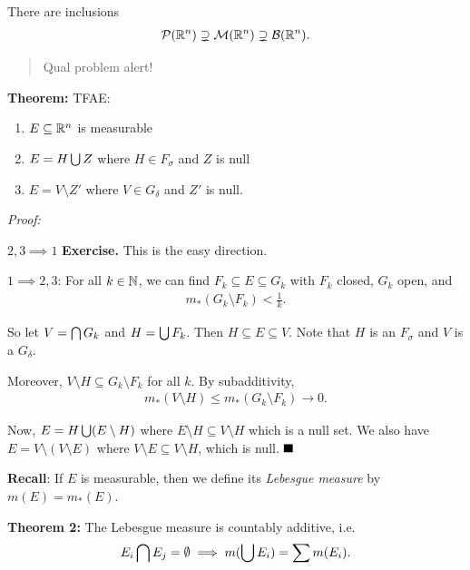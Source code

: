 There are inclusions
\begin{align*}
\mathcal P({\mathbb{R}}^n) \supsetneq \mathcal M({\mathbb{R}}^n) \supsetneq \mathcal B({\mathbb{R}}^n).
\end{align*}

\begin{quote}
Qual problem alert!
\end{quote}

\textbf{Theorem:} TFAE:

\begin{enumerate}
\def\labelenumi{\arabic{enumi}.}
\tightlist
\item
  \(E \subseteq {\mathbb{R}}^n\) is measurable
\item
  \(E = H \bigcup Z\) where \(H \in F_\sigma\) and \(Z\) is null
\item
  \(E = V\setminus Z'\) where \(V\in G_\delta\) and \(Z'\) is null.
\end{enumerate}

\emph{Proof:}

\(2,3 \implies 1\) \textbf{Exercise.} This is the easy direction.

\(1 \implies 2,3\): For all \(k \in {\mathbb{N}}\), we can find
\(F_ k\subseteq E \subseteq G_k\) with \(F_k\) closed, \(G_k\) open, and
\begin{align*}
m_*(G_k\setminus F_k) < \frac 1 k
.\end{align*}

So let \(V = \bigcap G_k\) and \(H = \bigcup F_k\). Then
\(H \subseteq E \subseteq V\). Note that \(H\) is an \(F_\sigma\) and
\(V\) is a \(G_\delta\).

Moreover, \(V\setminus H \subseteq G_k \setminus F_k\) for all \(k\). By
subadditivity,
\begin{align*}
m_*(V\setminus H) \leq m_*(G_k \setminus F_k) \to 0.
\end{align*}

Now, \(E = H \bigcup(E \setminus H)\) where
\(E\setminus H \subseteq V\setminus H\) which is a null set. We also
have \(E = V \setminus (V \setminus E)\) where
\(V\setminus E \subseteq V\setminus H\), which is null. \(\qed\)

\textbf{Recall}: If \(E\) is measurable, then we define its
\emph{Lebesgue measure} by \(m(E) = m_*(E)\).

\textbf{Theorem 2:} The Lebesgue measure is countably additive, i.e.
\begin{align*}
E_i \bigcap E_j = \emptyset \implies m(\bigcup E_i) = \sum m(E_i).
\end{align*}

